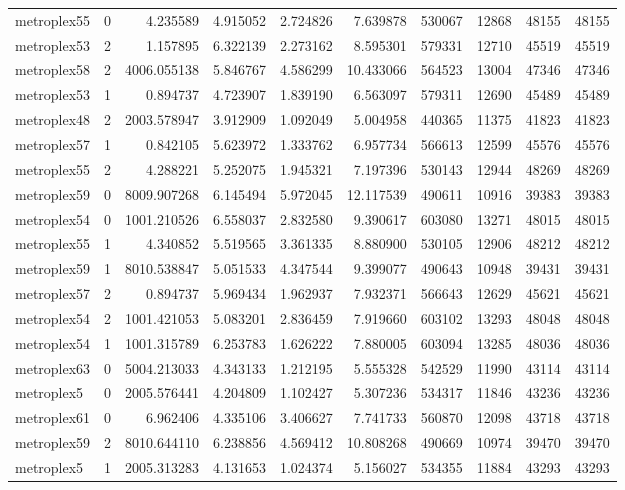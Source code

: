 \begin{longtable}{|l|r|r|r|r|r|r|r|r|r|}
metroplex55 & 0 & 4.235589 & 4.915052 & 2.724826 & 7.639878 & 530067 & 12868 & 48155 & 48155 \\
metroplex53 & 2 & 1.157895 & 6.322139 & 2.273162 & 8.595301 & 579331 & 12710 & 45519 & 45519 \\
metroplex58 & 2 & 4006.055138 & 5.846767 & 4.586299 & 10.433066 & 564523 & 13004 & 47346 & 47346 \\
metroplex53 & 1 & 0.894737 & 4.723907 & 1.839190 & 6.563097 & 579311 & 12690 & 45489 & 45489 \\
metroplex48 & 2 & 2003.578947 & 3.912909 & 1.092049 & 5.004958 & 440365 & 11375 & 41823 & 41823 \\
metroplex57 & 1 & 0.842105 & 5.623972 & 1.333762 & 6.957734 & 566613 & 12599 & 45576 & 45576 \\
metroplex55 & 2 & 4.288221 & 5.252075 & 1.945321 & 7.197396 & 530143 & 12944 & 48269 & 48269 \\
metroplex59 & 0 & 8009.907268 & 6.145494 & 5.972045 & 12.117539 & 490611 & 10916 & 39383 & 39383 \\
metroplex54 & 0 & 1001.210526 & 6.558037 & 2.832580 & 9.390617 & 603080 & 13271 & 48015 & 48015 \\
metroplex55 & 1 & 4.340852 & 5.519565 & 3.361335 & 8.880900 & 530105 & 12906 & 48212 & 48212 \\
metroplex59 & 1 & 8010.538847 & 5.051533 & 4.347544 & 9.399077 & 490643 & 10948 & 39431 & 39431 \\
metroplex57 & 2 & 0.894737 & 5.969434 & 1.962937 & 7.932371 & 566643 & 12629 & 45621 & 45621 \\
metroplex54 & 2 & 1001.421053 & 5.083201 & 2.836459 & 7.919660 & 603102 & 13293 & 48048 & 48048 \\
metroplex54 & 1 & 1001.315789 & 6.253783 & 1.626222 & 7.880005 & 603094 & 13285 & 48036 & 48036 \\
metroplex63 & 0 & 5004.213033 & 4.343133 & 1.212195 & 5.555328 & 542529 & 11990 & 43114 & 43114 \\
metroplex5 & 0 & 2005.576441 & 4.204809 & 1.102427 & 5.307236 & 534317 & 11846 & 43236 & 43236 \\
metroplex61 & 0 & 6.962406 & 4.335106 & 3.406627 & 7.741733 & 560870 & 12098 & 43718 & 43718 \\
metroplex59 & 2 & 8010.644110 & 6.238856 & 4.569412 & 10.808268 & 490669 & 10974 & 39470 & 39470 \\
metroplex5 & 1 & 2005.313283 & 4.131653 & 1.024374 & 5.156027 & 534355 & 11884 & 43293 & 43293 \\

\end{longtable}
